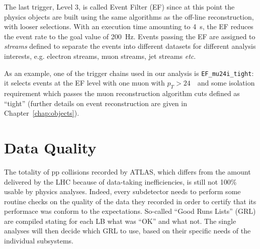 The last trigger, Level 3, is called Event Filter (EF) since
at this point the physics objects are built using the same
algorithms as the off-line reconstruction, with looser selections. With an execution time
amounting to 4~s, the EF reduces the event rate to the goal value
of 200~Hz.
Events passing the EF are assigned to {\it streams} defined to separate
the events into different datasets for different analysis interests, e.g.
electron streams, muon streams, jet streams {\it etc}.

As an example, one of the trigger chains used in our analysis is 
\texttt{EF\_mu24i\_tight}: it selects events at the EF level with one 
muon with $p_T>24$~\gev\ and some isolation requirement which passes
the muon reconstruction algorithm cuts defined as ``tight''
(further details on event reconstruction are given in Chapter~\ref{chap:objects}).

\section{Data Quality}\label{sec:daq}

The totality of pp collisions recorded by ATLAS, which differs from the amount
delivered by the LHC because of data-taking inefficiencies, is still
not 100\% usable by physics analyses. Indeed, every subdetector needs to
perform some routine checks %
on the quality of the data they recorded in order to certify that its performace
was conform to the expectations. So-called ``Good Runs Lists'' (GRL) are
compiled stating for each LB what was ``OK'' and what not.
The single analyses will then decide which GRL to use, based on their specific
needs of the individual subsystems.
